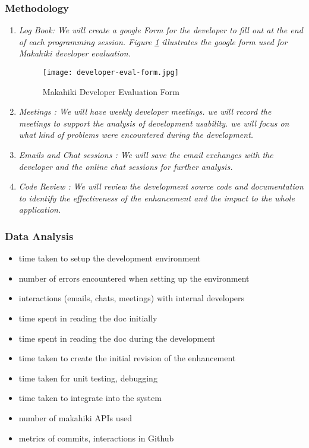 \documentclass[11pt]{article}
\begin{document}
\subsubsection{Methodology}
\begin{enumerate}
\item \em Log Book\em: We will create a google Form for the developer to fill out at the end of each programming session. Figure \ref{fig:developer-eval-form} illustrates the google form used for Makahiki developer evaluation.

\begin{figure}[htbp]
   \centering
   \texttt{[image: developer-eval-form.jpg]} 
   \caption{Makahiki Developer Evaluation Form}
   \label{fig:developer-eval-form}
\end{figure}
 
\item \em Meetings \em: We will have weekly developer meetings. we will record the meetings to support the analysis of development usability. we will focus on what kind of problems were encountered during the development.

\item \em Emails and Chat sessions \em: We will save the email exchanges with the developer and the online chat sessions for further analysis.

\item \em Code Review \em: We will review the development source code and documentation to identify the effectiveness of the enhancement and the impact to the whole application.

\end{enumerate}

\subsubsection{Data Analysis}
\begin{itemize}
 \item time taken to setup the development environment
 \item number of errors encountered when setting up the environment
 \item interactions (emails, chats, meetings) with internal developers
 \item time spent in reading the doc initially
 \item time spent in reading the doc during the development
 \item time taken to create the initial revision of the enhancement
 \item time taken for unit testing, debugging
 \item time taken to integrate into the system
 \item number of makahiki APIs used
 \item metrics of commits, interactions in Github
\end{itemize}
\end{document}
